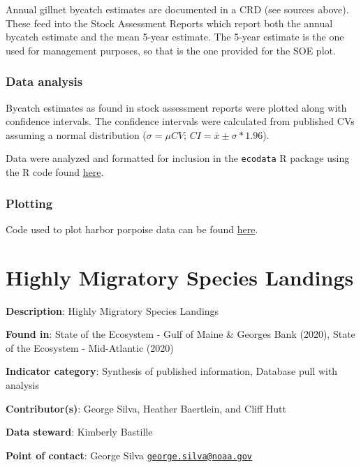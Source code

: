\documentclass[
]{book}
\begin{document}
Annual gillnet bycatch estimates are documented in a CRD (see sources above). These feed into the Stock Assessment Reports which report both the annual bycatch estimate and the mean 5-year estimate. The 5-year estimate is the one used for management purposes, so that is the one provided for the SOE plot.

\hypertarget{data-analysis-15}{%
\subsection{Data analysis}\label{data-analysis-15}}

Bycatch estimates as found in stock assessment reports were plotted along with confidence intervals. The confidence intervals were calculated from published CVs assuming a normal distribution (\(\sigma = \mu CV\); \(CI = \bar{x} \pm \sigma * 1.96\)).

Data were analyzed and formatted for inclusion in the \texttt{ecodata} R package using the R code found \href{https://raw.githubusercontent.com/NOAA-EDAB/ecodata/master/data-raw/get_harborporpoise.R}{here}.

\hypertarget{plotting-10}{%
\subsection{Plotting}\label{plotting-10}}

Code used to plot harbor porpoise data can be found \href{https://github.com/NOAA-EDAB/tech-doc/tree/master/R/stored_scripts/hp_indicator_plotting.R}{here}.

\hypertarget{highly-migratory-species-landings}{%
\chapter{Highly Migratory Species Landings}\label{highly-migratory-species-landings}}

\textbf{Description}: Highly Migratory Species Landings

\textbf{Found in}: State of the Ecosystem - Gulf of Maine \& Georges Bank (2020), State of the Ecosystem - Mid-Atlantic (2020)

\textbf{Indicator category}: Synthesis of published information, Database pull with analysis

\textbf{Contributor(s)}: George Silva, Heather Baertlein, and Cliff Hutt

\textbf{Data steward}: Kimberly Bastille

\textbf{Point of contact}: George Silva \href{mailto:george.silva@noaa.gov}{\nolinkurl{george.silva@noaa.gov}}
\end{document}
